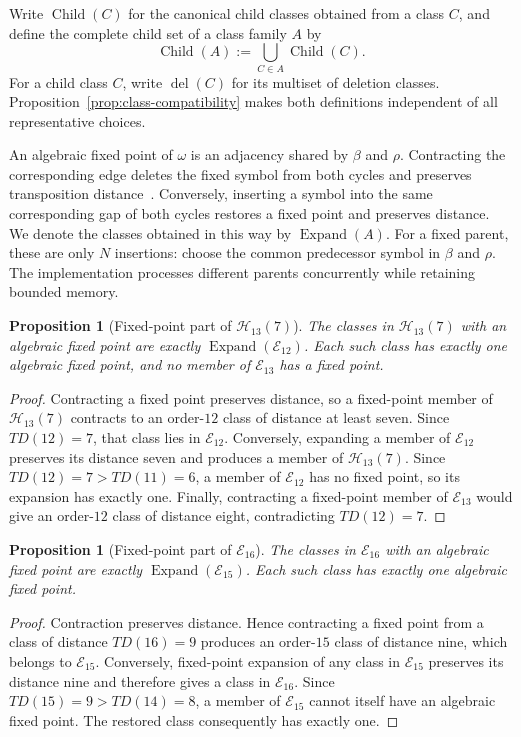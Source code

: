 \documentclass[11pt]{article}
\newtheorem{proposition}[theorem]{Proposition}
\theoremstyle{definition}
\theoremstyle{remark}
\newcommand{\En}{\mathcal E}
\newcommand{\Hn}{\mathcal H}
\newcommand{\Del}{\operatorname{del}}
\newcommand{\Child}{\operatorname{Child}}
\begin{document}
Write $\Child(C)$ for the canonical child classes obtained from a class $C$,
and define the complete child set of a class family $A$ by
\[
  \Child(A):=\bigcup_{C\in A}\Child(C).
\]
For a child class $C$, write $\Del(C)$ for its multiset of deletion classes.
Proposition~\ref{prop:class-compatibility} makes both definitions independent
of all representative choices.

An algebraic fixed point of $\omega$ is an adjacency shared by $\beta$ and
$\rho$.  Contracting the corresponding edge deletes the fixed symbol from
both cycles and preserves transposition distance~\cite{SilvaEtAl2026}.
Conversely, inserting a symbol into the same corresponding gap of both cycles
restores a fixed point and preserves distance.  We denote the classes obtained
in this way by $\operatorname{Expand}(A)$.  For a fixed parent, these are only
$N$ insertions: choose the common predecessor symbol in $\beta$ and $\rho$.
The implementation processes different parents concurrently while retaining
bounded memory.

\begin{proposition}[Fixed-point part of $\Hn_{13}(7)$]
The classes in $\Hn_{13}(7)$ with an algebraic fixed point are exactly
$\operatorname{Expand}(\En_{12})$.  Each such class has exactly one algebraic
fixed point, and no member of $\En_{13}$ has a fixed point.
\end{proposition}

\begin{proof}
Contracting a fixed point preserves distance, so a fixed-point member of
$\Hn_{13}(7)$ contracts to an order-$12$ class of distance at least seven.
Since $TD(12)=7$, that class lies in $\En_{12}$.  Conversely, expanding a
member of $\En_{12}$ preserves its distance seven and produces a member of
$\Hn_{13}(7)$.  Since $TD(12)=7>TD(11)=6$, a member of $\En_{12}$ has no
fixed point, so its expansion has exactly one.  Finally, contracting a
fixed-point member of $\En_{13}$ would give an order-$12$ class of distance
eight, contradicting $TD(12)=7$.
\end{proof}

\begin{proposition}[Fixed-point part of $\En_{16}$]
The classes in $\En_{16}$ with an algebraic fixed point are exactly
$\operatorname{Expand}(\En_{15})$.  Each such class has exactly one algebraic
fixed point.
\end{proposition}

\begin{proof}
Contraction preserves distance.  Hence contracting a fixed point from a class
of distance $TD(16)=9$ produces an order-$15$ class of distance nine, which
belongs to $\En_{15}$.  Conversely, fixed-point expansion of any class in
$\En_{15}$ preserves its distance nine and therefore gives a class in
$\En_{16}$.  Since $TD(15)=9>TD(14)=8$, a member of $\En_{15}$ cannot itself
have an algebraic fixed point.  The restored class consequently has exactly
one.
\end{proof}
\end{document}
